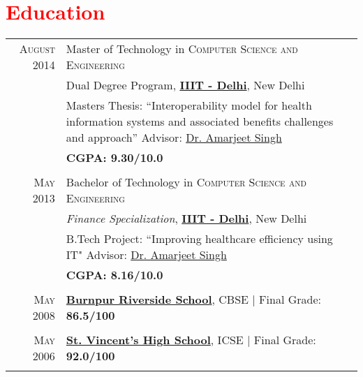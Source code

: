 \documentclass[a4paper,10pt]{article} %
\begin{document}
\section{ \texorpdfstring{\textcolor{red}{Education}}{Education} }
\begin{tabular}{rp{15cm}}	
\textsc{August} 2014 & Master of Technology in \textsc{Computer Science and Engineering}\\
& Dual Degree Program, \href{http://www.iiitd.ac.in}{\textbf{IIIT - Delhi}}, New Delhi\\
& Masters Thesis: ``Interoperability model for health information systems and \newline associated benefits challenges and approach'' \newline \small Advisor: \href{https://www.iiitd.edu.in/~amarjeet/}{Dr. Amarjeet Singh}  \\
&\normalsize \textbf{\textsc{CGPA}: 9.30/10.0}\\
&\\


\textsc{May} 2013& Bachelor of Technology in \textsc{}\textsc{Computer Science and Engineering} \\&
 \emph{Finance Specialization}, \href{http://www.iiitd.ac.in}{\textbf{IIIT - Delhi}}, New Delhi\\
& B.Tech Project: ``Improving healthcare efficiency using IT" \newline \small Advisor: \href{https://www.iiitd.edu.in/~amarjeet/}{Dr. Amarjeet Singh}\\
&\normalsize \textbf{\textsc{CGPA}: 8.16/10.0} \\
&\\


\textsc{May} 2008& \href{http://www.brsschool.org/}{\textbf{Burnpur Riverside School}}, CBSE | Final Grade:\textbf{ 86.5/100}\\
&\\


\textsc{May} 2006& \href{http://svsasansol.com/}{\textbf{St. Vincent's High School}}, ICSE | Final Grade:\textbf{ 92.0/100}\\
&\\
\end{tabular}


\end{document}
